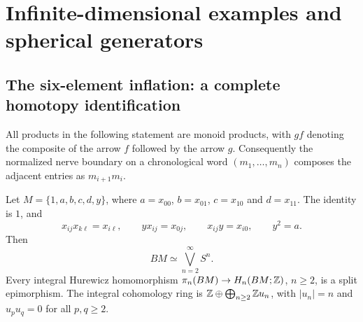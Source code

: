 \section{Infinite-dimensional examples and spherical generators}
\label{sec:E}

\subsection{The six-element inflation: a complete homotopy identification}
All products in the following statement are monoid products, with $gf$ denoting
the composite of the arrow $f$ followed by the arrow $g$. Consequently the
normalized nerve boundary on a chronological word $(m_1,\ldots,m_n)$ composes
the adjacent entries as $m_{i+1}m_i$.

\begin{theorem}\label{thm:E-wedge}
Let $M=\{1,a,b,c,d,y\}$, where $a=x_{00}$, $b=x_{01}$,
$c=x_{10}$ and $d=x_{11}$. The identity is $1$, and
\[
 x_{ij}x_{k\ell}=x_{i\ell},\qquad
 yx_{ij}=x_{0j},\qquad x_{ij}y=x_{i0},\qquad y^2=a.
\]
Then
\[
 BM\simeq\bigvee_{n=2}^{\infty}S^n.
\]
Every integral Hurewicz homomorphism $\pi_n(BM)\to H_n(BM;\mathbb Z)$,
$n\ge2$, is a split epimorphism. The integral cohomology ring is
$\mathbb Z\oplus\bigoplus_{n\ge2}\mathbb Z u_n$, with $|u_n|=n$ and
$u_pu_q=0$ for all $p,q\ge2$.
\end{theorem}

